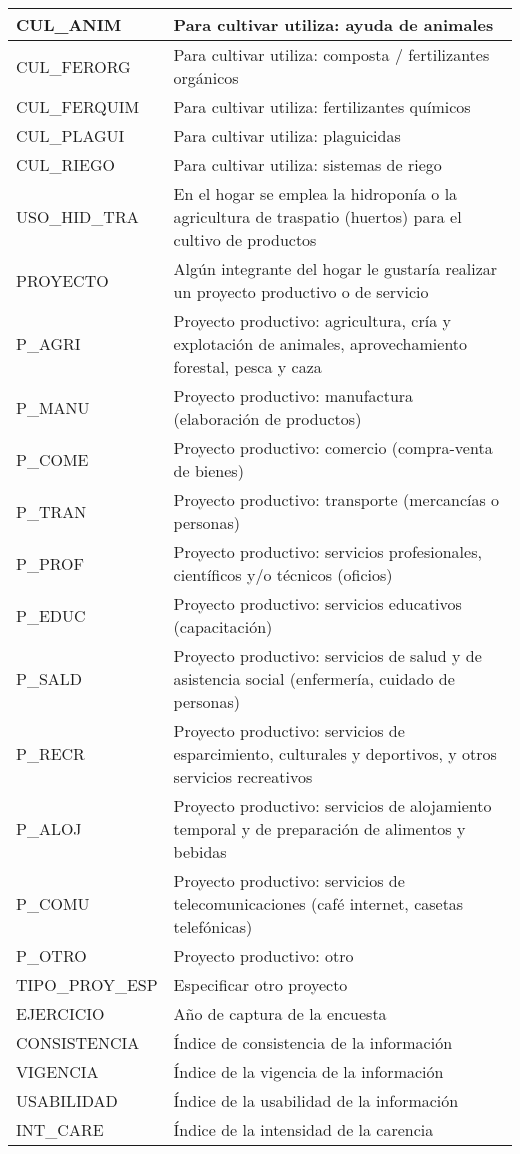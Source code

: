 \begin{longtable}{|p{8cm}|p{8cm}|}
    \hline
    CUL\_ANIM & Para cultivar utiliza: ayuda de animales\\
    \hline
    CUL\_FERORG & Para cultivar utiliza: composta / fertilizantes orgánicos \\
    \hline
    CUL\_FERQUIM & Para cultivar utiliza: fertilizantes químicos \\
    \hline
    CUL\_PLAGUI & Para cultivar utiliza: plaguicidas\\
    \hline
    CUL\_RIEGO & Para cultivar utiliza: sistemas de riego \\
    \hline
    USO\_HID\_TRA & En el hogar se emplea la hidroponía o la agricultura de traspatio (huertos) para el cultivo de productos \\
    \hline
    PROYECTO & Algún integrante del hogar le gustaría realizar un proyecto productivo o de servicio \\
    \hline
    P\_AGRI & Proyecto productivo: agricultura, cría y explotación de animales, aprovechamiento forestal, pesca y caza \\
    \hline
    P\_MANU & Proyecto productivo: manufactura (elaboración de productos) \\
    \hline
    P\_COME & Proyecto productivo: comercio (compra-venta de bienes)\\
    \hline
    P\_TRAN & Proyecto productivo: transporte (mercancías o personas)\\
    \hline
    P\_PROF & Proyecto productivo: servicios profesionales, científicos y/o técnicos (oficios)\\
    \hline
    P\_EDUC & Proyecto productivo: servicios educativos (capacitación) \\
    \hline
    P\_SALD & Proyecto productivo: servicios de salud y de asistencia social (enfermería, cuidado de personas)\\
    \hline
    P\_RECR & Proyecto productivo: servicios de esparcimiento, culturales y deportivos, y otros servicios recreativos\\
    \hline
    P\_ALOJ & Proyecto productivo: servicios de alojamiento temporal y de preparación de alimentos y bebidas\\
    \hline
    P\_COMU & Proyecto productivo: servicios de telecomunicaciones (café internet, casetas telefónicas)\\
    \hline
    P\_OTRO & Proyecto productivo: otro\\
    \hline
    TIPO\_PROY\_ESP &  Especificar otro proyecto \\
    \hline
    EJERCICIO & Año de captura de la encuesta \\
    \hline
    CONSISTENCIA & Índice de consistencia de la información \\
    \hline
    VIGENCIA & Índice de la vigencia de la información \\
    \hline
    USABILIDAD & Índice de la usabilidad de la información \\
    \hline
    INT\_CARE & Índice de la intensidad de la carencia \\
    \hline

\end{longtable}
\label{tab:varsocioe}
